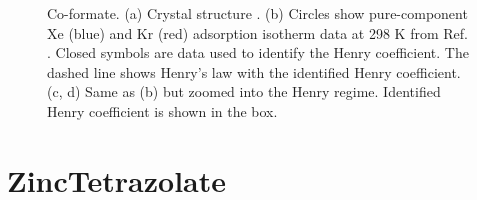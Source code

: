     \begin{figure}[h!]
       \centering
  
       
       \caption{Co-formate. (a) Crystal structure \cite{Co-formate_structure}.
       (b) Circles show pure-component Xe (blue) and Kr (red) adsorption isotherm data at 298 K from Ref. \cite{Co-formate_XeKr}. 
       Closed symbols are data used to identify the Henry coefficient. The dashed line shows Henry's law with the identified Henry coefficient.
       (c, d) Same as (b) but zoomed into the Henry regime. Identified Henry coefficient is shown in the box.}
    \end{figure}
    
    \clearpage
    
    
    \section{ZincTetrazolate}
    
